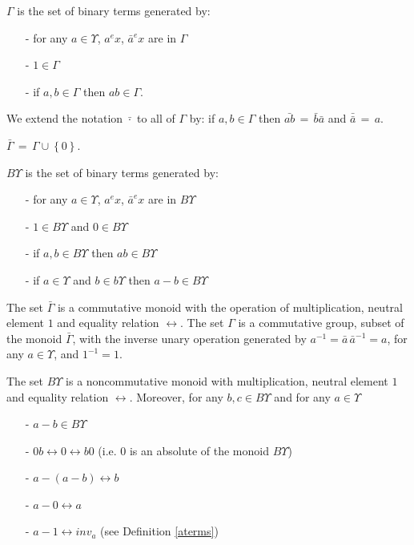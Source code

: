 \begin{definition}
$\Gamma$ is the set of binary terms generated by: 
\begin{enumerate}
\item[-] for any $a \in \Upsilon$, $\displaystyle a^{e} x$, $\displaystyle \bar{a}^{e} x$ are in $\Gamma$
\item[-] $\displaystyle 1 \in \Gamma$
\item[-] if $a, b \in \Gamma$ then $ab \in \Gamma$.
\end{enumerate}
We extend the notation $\displaystyle \bar{\cdot}$ to all of $\Gamma$ by: if $a, b \in \Gamma$ then $\displaystyle \bar{ab} \, = \, \bar{b} \bar{a}$ and $\bar{\bar{a}} \, = \, a$. 

$\displaystyle \bar{\Gamma} \, = \, \Gamma \cup \left\{ 0 \right\}$. 

$B\Upsilon$ is the set of binary terms generated by: 
\begin{enumerate}
\item[-] for any $a \in \Upsilon$, $\displaystyle a^{e} x$, $\displaystyle \bar{a}^{e} x$ are in $B\Upsilon$
\item[-] $\displaystyle 1 \in B\Upsilon$ and $\displaystyle 0 \in B\Upsilon$
\item[-] if $a, b \in B\Upsilon$ then $ab \in B\Upsilon$
\item[-] if $a \in \Upsilon$ and $b \in b\Upsilon$ then $\displaystyle a-b \in B\Upsilon$ 
\end{enumerate}
\end{definition}


\begin{proposition}
The set $\displaystyle \bar{\Gamma}$ is a commutative monoid with the operation of multiplication, neutral element $1$ and equality relation $\longleftrightarrow$. The set $\Gamma$ is a commutative group, subset of the monoid  $\displaystyle \bar{\Gamma}$, with the inverse unary operation generated by $\displaystyle a^{-1} = \bar{a} \, \bar{a}^{-1} = a$, for any $a \in \Upsilon$, and $\displaystyle 1^{-1} = 1$. 

The set $B\Upsilon$ is a noncommutative monoid with multiplication, neutral element $1$ and equality relation $\longleftrightarrow$. Moreover, for any $b, c \in B\Upsilon$ and for any $a \in \Upsilon$
\begin{enumerate}
\item[-] $a-b \in B\Upsilon$
\item[-] $0b \longleftrightarrow 0 \longleftrightarrow b0$ (i.e. $0$ is an absolute of the monoid $B\Upsilon$)
\item[-] $a-(a-b) \longleftrightarrow b$
\item[-] $a-0 \longleftrightarrow a$
\item[-] $\displaystyle a-1 \longleftrightarrow inv_{a}$ (see Definition \ref{aterms})
\end{enumerate}
\end{proposition}
